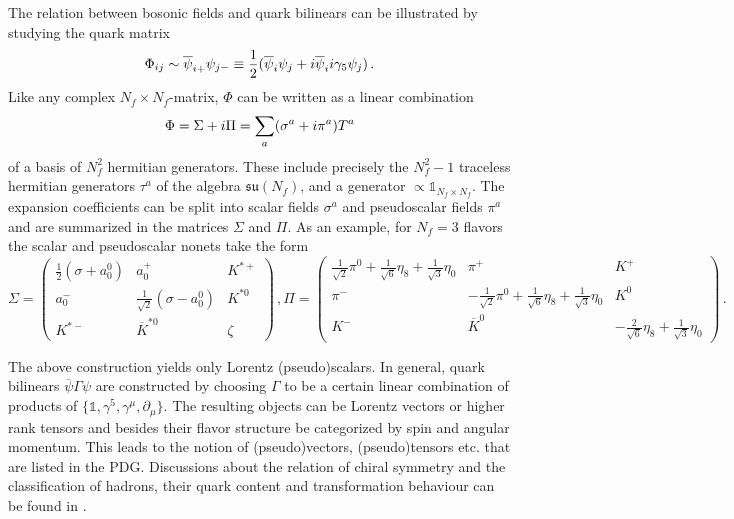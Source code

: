 The relation between bosonic fields and quark bilinears can be illustrated by studying the quark matrix
\begin{equation}
    \Phi_{ij}\sim\overline{\psi}_{i+}\psi_{j-}\equiv\frac{1}{2}(\overline{\psi}_i\psi_j+{i}\overline{\psi}_i{i}\gamma_5\psi_j)\,.
\end{equation}
Like any complex $N_f\times N_f$-matrix, $\Phi$ can be written as a linear combination
\begin{equation}
    \Phi=\Sigma+{i}\Pi=\sum_a(\sigma^a+{i} \pi^a)T^a
\end{equation}
of a basis of $N_f^2$ hermitian generators. These include precisely the $N_f^2-1$ traceless hermitian generators $\tau^a$ of the algebra $\mathfrak{su}(N_f)$, and a generator $\propto\mathbb{1}_{N_f\times N_f}$. The expansion coefficients can be split into scalar fields $\sigma^a$ and pseudoscalar fields $\pi^a$ and are summarized in the matrices $\Sigma$ and $\Pi$. As an example, for $N_f=3$ flavors the scalar and pseudoscalar nonets take the form
\begin{subequations}
    \begin{equation}
        \Sigma=\begin{pmatrix}
            \frac{1}{2}(\sigma+a_0^0)&a_0^+&K^{*+}\\
            a_0^-&\frac{1}{\sqrt{2}}(\sigma-a_0^0)&K^{*0}\\
            K^{*-}&\overline{K}^{*0}&\zeta
        \end{pmatrix}\,,
    \end{equation}
    \begin{equation}
        \Pi=\begin{pmatrix}
            \frac{1}{\sqrt{2}}\pi^0+\frac{1}{\sqrt{6}}\eta_8+\frac{1}{\sqrt{3}}\eta_0&\pi^+&K^+\\
            \pi^-&-\frac{1}{\sqrt{2}}\pi^0+\frac{1}{\sqrt{6}}\eta_8+\frac{1}{\sqrt{3}}\eta_0&K^0\\
            K^-&\overline{K}^0&-\frac{2}{\sqrt{6}}\eta_8+\frac{1}{\sqrt{3}}\eta_0
        \end{pmatrix}\,.
    \end{equation}
\end{subequations}

The above construction yields only Lorentz (pseudo)scalars. In general, quark bilinears $\overline{\psi}\Gamma\psi$ are constructed by choosing $\Gamma$ to be a certain linear combination of products of ${\{\mathbb{1},\gamma^5,\gamma^\mu,\partial_\mu\}}$. The resulting objects can be Lorentz vectors or higher rank tensors and besides their flavor structure be categorized by spin and angular momentum. This leads to the notion of (pseudo)vectors, (pseudo)tensors etc. that are listed in the PDG. Discussions about the relation of chiral symmetry and the classification of hadrons, their quark content and transformation behaviour can be found in \cite{KoenigsteinGiacosa_2016,GiacosaEtAl_2018}.



